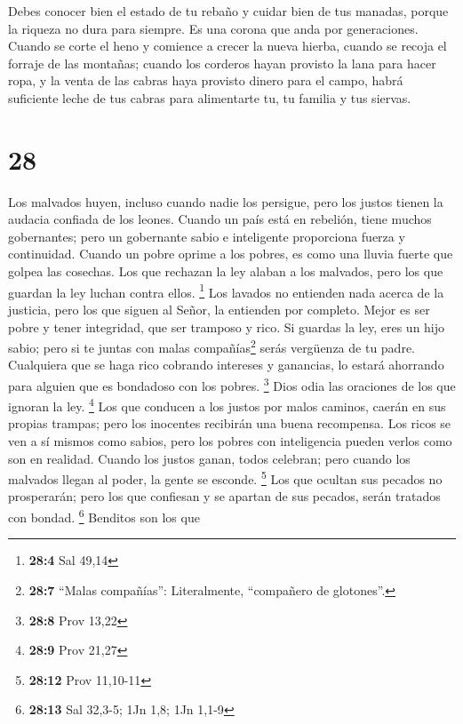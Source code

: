  Debes conocer bien el estado de tu rebaño y cuidar bien
de tus manadas,  porque la riqueza no dura para siempre.
Es una corona que anda por generaciones.  Cuando se corte
el heno y comience a crecer la nueva hierba, cuando se recoja el forraje
de las montañas;  cuando los corderos hayan provisto la
lana para hacer ropa, y la venta de las cabras haya provisto dinero para
el campo,  habrá suficiente leche de tus cabras para
alimentarte tu, tu familia y tus siervas.

\hypertarget{section-27}{%
\section{28}\label{section-27}}

 Los malvados huyen, incluso cuando nadie los persigue,
pero los justos tienen la audacia confiada de los leones. 
Cuando un país está en rebelión, tiene muchos gobernantes; pero un
gobernante sabio e inteligente proporciona fuerza y continuidad.
 Cuando un pobre oprime a los pobres, es como una lluvia
fuerte que golpea las cosechas.  Los que rechazan la ley
alaban a los malvados, pero los que guardan la ley luchan contra ellos.
\footnote{\textbf{28:4} Sal 49,14}  Los lavados no
entienden nada acerca de la justicia, pero los que siguen al Señor, la
entienden por completo.  Mejor es ser pobre y tener
integridad, que ser tramposo y rico.  Si guardas la ley,
eres un hijo sabio; pero si te juntas con malas compañías\footnote{\textbf{28:7}
  ``Malas compañías'': Literalmente, ``compañero de glotones''.} serás
vergüenza de tu padre.  Cualquiera que se haga rico
cobrando intereses y ganancias, lo estará ahorrando para alguien que es
bondadoso con los pobres. \footnote{\textbf{28:8} Prov 13,22}
 Dios odia las oraciones de los que ignoran la ley.
\footnote{\textbf{28:9} Prov 21,27}  Los que conducen a
los justos por malos caminos, caerán en sus propias trampas; pero los
inocentes recibirán una buena recompensa.  Los ricos se
ven a sí mismos como sabios, pero los pobres con inteligencia pueden
verlos como son en realidad.  Cuando los justos ganan,
todos celebran; pero cuando los malvados llegan al poder, la gente se
esconde. \footnote{\textbf{28:12} Prov 11,10-11}  Los que
ocultan sus pecados no prosperarán; pero los que confiesan y se apartan
de sus pecados, serán tratados con bondad. \footnote{\textbf{28:13} Sal
  32,3-5; 1Jn 1,8; 1Jn 1,1-9}  Benditos son los que
